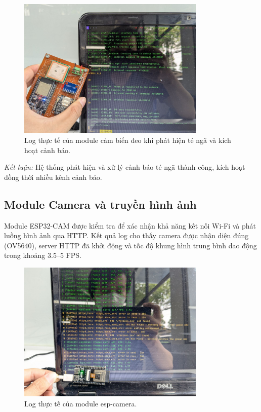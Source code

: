 \begin{figure}[H]
    \centering
    \includegraphics[width=0.8\textwidth]{figures/module1_real_log.jpg}
    \caption{Log thực tế của module cảm biến đeo khi phát hiện té ngã và kích hoạt cảnh báo.}
    \label{fig:module1_real_log}
\end{figure}

\textit{Kết luận:} Hệ thống phát hiện và xử lý cảnh báo té ngã thành công, kích hoạt đồng thời nhiều kênh cảnh báo.

\subsection{Module Camera và truyền hình ảnh}
Module ESP32-CAM được kiểm tra để xác nhận khả năng kết nối Wi-Fi và phát luồng hình ảnh qua HTTP.  
Kết quả log cho thấy camera được nhận diện đúng (OV5640), server HTTP đã khởi động và tốc độ khung hình trung bình dao động trong khoảng 3.5–5 FPS.
\begin{figure}[H]
    \centering
    \includegraphics[width=0.8\textwidth]{figures/module2_real_log.jpg}
    \caption{Log thực tế của module esp-camera.}
    \label{fig:module2_real_log}
\end{figure}


